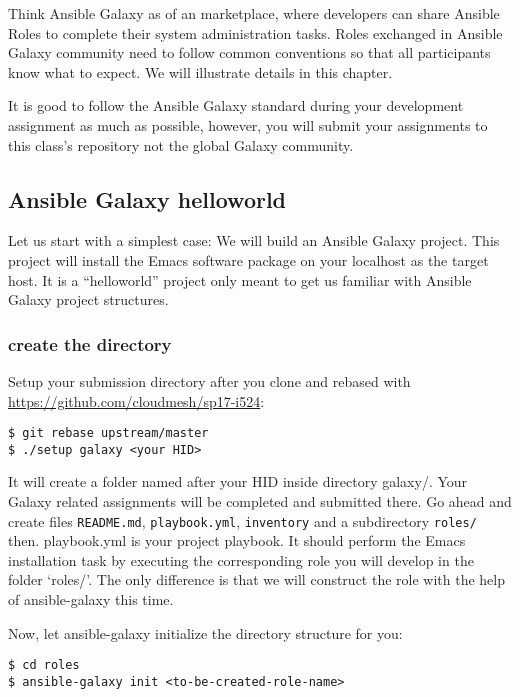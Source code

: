 Think Ansible Galaxy as of an marketplace, where developers can share
Ansible Roles to complete their system administration tasks. Roles
exchanged in Ansible Galaxy community need to follow common conventions
so that all participants know what to expect. We will illustrate details
in this chapter.

It is good to follow the Ansible Galaxy standard during your development
assignment as much as possible, however, you will submit your
assignments to this class's repository not the global Galaxy community.

\subsection{Ansible Galaxy helloworld}\label{ansible-galaxy-helloworld}

Let us start with a simplest case: We will build an Ansible Galaxy
project. This project will install the Emacs software package on your
localhost as the target host. It is a ``helloworld'' project only meant
to get us familiar with Ansible Galaxy project structures.

\subsubsection{create the directory}\label{create-the-directory}

Setup your submission directory after you clone and rebased with
\url{https://github.com/cloudmesh/sp17-i524}:

\begin{verbatim}
$ git rebase upstream/master
$ ./setup galaxy <your HID>
\end{verbatim}

It will create a folder named after your HID inside directory galaxy/.
Your Galaxy related assignments will be completed and submitted there.
Go ahead and create files \texttt{README.md}, \texttt{playbook.yml},
\texttt{inventory} and a subdirectory \texttt{roles/} then. playbook.yml
is your project playbook. It should perform the Emacs installation task
by executing the corresponding role you will develop in the folder
`roles/'. The only difference is that we will construct the role with
the help of ansible-galaxy this time.

Now, let ansible-galaxy initialize the directory structure for you:

\begin{verbatim}
$ cd roles
$ ansible-galaxy init <to-be-created-role-name>
\end{verbatim}

